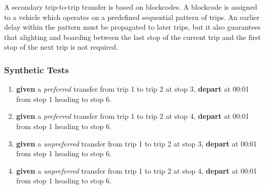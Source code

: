 \documentclass[a4paper,11pt]{article}
\begin{document}
\begin{enumerate}
\begin{enumerate}
A secondary trip-to-trip transfer is based on blockcodes.
A blockcode is assigned to a vehicle which operates on a predefined sequential pattern of trips.
An earlier delay within the pattern must be propagated to later trips, but it also guarantees that alighting and boarding between the last stop of the current trip and the first stop of the next trip is not required.

\begin{figure}[h]
\vspace{1em}
\raggedleft
\begin{minipage}{250pt}
\end{minipage}
\label{fig:blocktoblock_network}
\vspace{0em}
\end{figure}

\subsubsection*{Synthetic Tests}
\begin{enumerate}
\item \textbf{given} a \textit{preferred} transfer from trip 1 to trip 2 at stop 3, \textbf{depart} at 00:01 from stop 1 heading to stop 6.
\item \textbf{given} a \textit{preferred} transfer from trip 1 to trip 2 at stop 4, \textbf{depart} at 00:01 from stop 1 heading to stop 6.
\item \textbf{given} a \textit{unpreferred} transfer from trip 1 to trip 2 at stop 3, \textbf{depart} at 00:01 from stop 1 heading to stop 6.
\item \textbf{given} a \textit{unpreferred} transfer from trip 1 to trip 2 at stop 4, \textbf{depart} at 00:01 from stop 1 heading to stop 6.
\end{enumerate}



\end{enumerate}
\end{enumerate}
\end{document}

